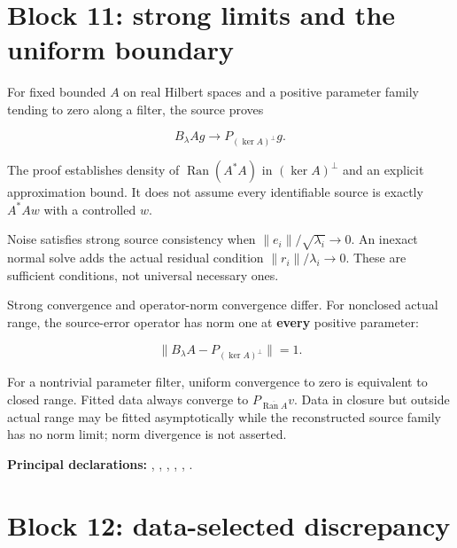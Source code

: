 \documentclass[11pt]{article}
\begin{document}
\hypertarget{block-11-strong-limits-and-the-uniform-boundary}{%
\section{Block 11: strong limits and the uniform
boundary}\label{block-11-strong-limits-and-the-uniform-boundary}}

For fixed bounded \(A\) on real Hilbert spaces and a positive parameter
family tending to zero along a filter, the source proves

\[
B_\lambda Ag\longrightarrow P_{(\ker A)^\perp}g.
\]

The proof establishes density of \(\operatorname{Ran}(A^*A)\) in
\((\ker A)^\perp\) and an explicit approximation bound. It does not
assume every identifiable source is exactly \(A^*Aw\) with a controlled
\(w\).

Noise satisfies strong source consistency when
\(\|e_i\|/\sqrt{\lambda_i}\to0\). An inexact normal solve adds the
actual residual condition \(\|r_i\|/\lambda_i\to0\). These are
sufficient conditions, not universal necessary ones.

Strong convergence and operator-norm convergence differ. For nonclosed
actual range, the source-error operator has norm one at \textbf{every}
positive parameter:

\[
\|B_\lambda A-P_{(\ker A)^\perp}\|=1.
\]

For a nontrivial parameter filter, uniform convergence to zero is
equivalent to closed range. Fitted data always converge to
\(P_{\overline{\operatorname{Ran}A}}v\). Data in closure but outside
actual range may be fitted asymptotically while the reconstructed source
family has no norm limit; norm divergence is not asserted.

\textbf{Principal declarations:}
\texttt{},
\texttt{},
\texttt{},
\texttt{},
\texttt{},
\texttt{}.

\hypertarget{block-12-data-selected-discrepancy}{%
\section{Block 12: data-selected
discrepancy}\label{block-12-data-selected-discrepancy}}
\end{document}
